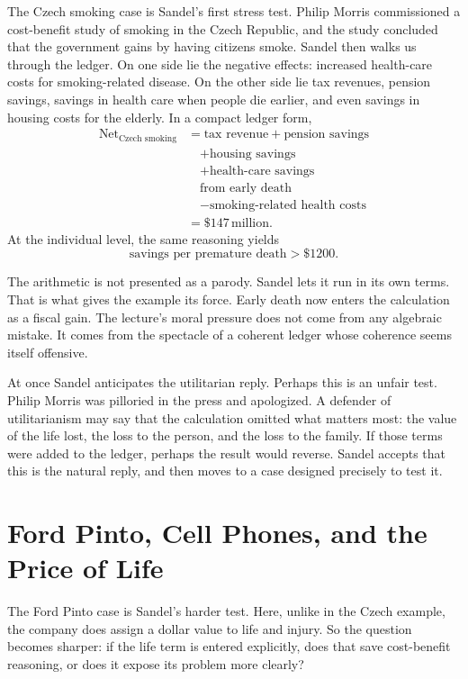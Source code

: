 The Czech smoking case is Sandel's first stress test. Philip Morris commissioned a cost-benefit study of smoking in the Czech Republic, and the study concluded that the government gains by having citizens smoke. Sandel then walks us through the ledger. On one side lie the negative effects: increased health-care costs for smoking-related disease. On the other side lie tax revenues, pension savings, savings in health care when people die earlier, and even savings in housing costs for the elderly. In a compact ledger form,
\begin{align}
\text{Net}_{\text{Czech smoking}}
&=\text{tax revenue}
+\text{pension savings} \nonumber\\
&\quad+\text{housing savings} \nonumber\\
&\quad+\text{health-care savings} \nonumber\\
&\quad\text{from early death} \nonumber\\
&\quad-\text{smoking-related health costs} \nonumber\\
&=\$147\,\text{million}.
\end{align}
At the individual level, the same reasoning yields
\begin{equation}
\text{savings per premature death} > \$1200.
\end{equation}

The arithmetic is not presented as a parody. Sandel lets it run in its own terms. That is what gives the example its force. Early death now enters the calculation as a fiscal gain. The lecture's moral pressure does not come from any algebraic mistake. It comes from the spectacle of a coherent ledger whose coherence seems itself offensive.

At once Sandel anticipates the utilitarian reply. Perhaps this is an unfair test. Philip Morris was pilloried in the press and apologized. A defender of utilitarianism may say that the calculation omitted what matters most: the value of the life lost, the loss to the person, and the loss to the family. If those terms were added to the ledger, perhaps the result would reverse. Sandel accepts that this is the natural reply, and then moves to a case designed precisely to test it.

\section{Ford Pinto, Cell Phones, and the Price of Life}

The Ford Pinto case is Sandel's harder test. Here, unlike in the Czech example, the company does assign a dollar value to life and injury. So the question becomes sharper: if the life term is entered explicitly, does that save cost-benefit reasoning, or does it expose its problem more clearly?

